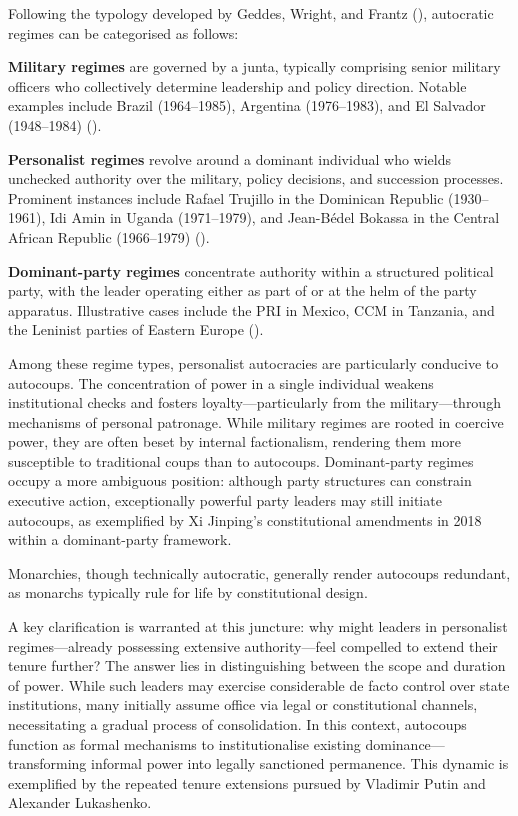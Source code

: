 \documentclass[
  12pt,
]{report}
\begin{document}
Following the typology developed by Geddes, Wright, and Frantz
(), autocratic regimes can be categorised
as follows:

\textbf{Military regimes} are governed by a junta, typically comprising
senior military officers who collectively determine leadership and
policy direction. Notable examples include Brazil (1964--1985),
Argentina (1976--1983), and El Salvador (1948--1984)
().

\textbf{Personalist regimes} revolve around a dominant individual who
wields unchecked authority over the military, policy decisions, and
succession processes. Prominent instances include Rafael Trujillo in the
Dominican Republic (1930--1961), Idi Amin in Uganda (1971--1979), and
Jean-Bédel Bokassa in the Central African Republic (1966--1979)
().

\textbf{Dominant-party regimes} concentrate authority within a
structured political party, with the leader operating either as part of
or at the helm of the party apparatus. Illustrative cases include the
PRI in Mexico, CCM in Tanzania, and the Leninist parties of Eastern
Europe ().

Among these regime types, personalist autocracies are particularly
conducive to autocoups. The concentration of power in a single
individual weakens institutional checks and fosters
loyalty---particularly from the military---through mechanisms of
personal patronage. While military regimes are rooted in coercive power,
they are often beset by internal factionalism, rendering them more
susceptible to traditional coups than to autocoups. Dominant-party
regimes occupy a more ambiguous position: although party structures can
constrain executive action, exceptionally powerful party leaders may
still initiate autocoups, as exemplified by Xi Jinping's constitutional
amendments in 2018 within a dominant-party framework.

Monarchies, though technically autocratic, generally render autocoups
redundant, as monarchs typically rule for life by constitutional design.

A key clarification is warranted at this juncture: why might leaders in
personalist regimes---already possessing extensive authority---feel
compelled to extend their tenure further? The answer lies in
distinguishing between the scope and duration of power. While such
leaders may exercise considerable de facto control over state
institutions, many initially assume office via legal or constitutional
channels, necessitating a gradual process of consolidation. In this
context, autocoups function as formal mechanisms to institutionalise
existing dominance---transforming informal power into legally sanctioned
permanence. This dynamic is exemplified by the repeated tenure
extensions pursued by Vladimir Putin and Alexander Lukashenko.
\end{document}
